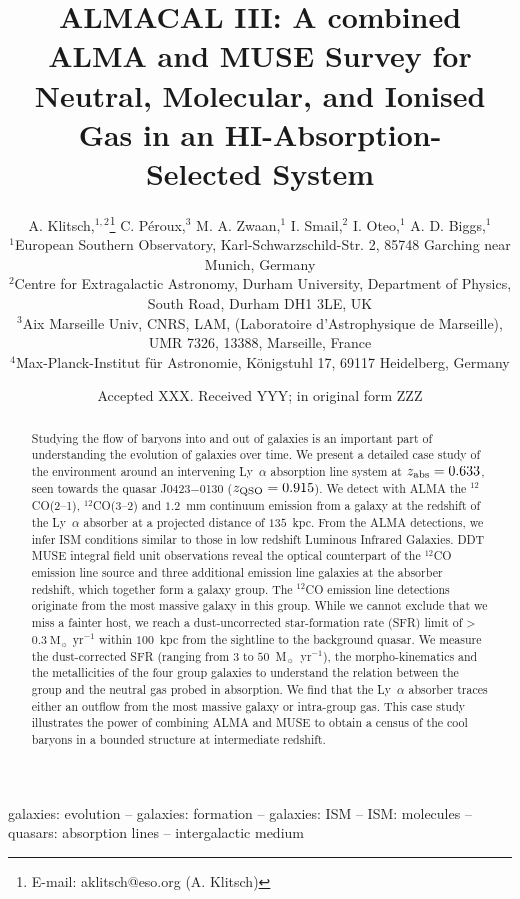 \documentclass[a4paper,fleqn,usenatbib]{mnras}
\title[ALMACAL III: Neutral, Molecular, and Ionised Gas around an Absorption-Selected System]{ALMACAL III: A combined ALMA and MUSE Survey for Neutral, Molecular, and Ionised Gas in an HI-Absorption-\\Selected System}
\author[A. Klitsch et al.]{A. Klitsch,$^{1,2}$\thanks{E-mail: aklitsch@eso.org (A. Klitsch)}
C. P\'eroux,$^{3}$ 
M. A. Zwaan,$^{1}$ 
I. Smail,$^{2}$ 
I. Oteo,$^{1}$ 
A. D. Biggs,$^{1}$ 
\newauthor{G. Popping$^{1,4}$ 
and A. M. Swinbank$^{2}$}\\
$^{1}$European Southern Observatory, Karl-Schwarzschild-Str. 2, 85748 Garching near Munich, Germany\\
$^{2}$Centre for Extragalactic Astronomy, Durham University, Department of Physics, South Road, Durham DH1 3LE, UK\\
$^{3}$Aix Marseille Univ, CNRS, LAM, (Laboratoire d'Astrophysique de Marseille), UMR 7326, 13388, Marseille, France\\
$^4$Max-Planck-Institut für Astronomie, Königstuhl 17, 69117 Heidelberg, Germany}
\date{Accepted XXX. Received YYY; in original form ZZZ}
\begin{document}
\label{firstpage}
\pagerange{\pageref{firstpage}--\pageref{lastpage}}
\maketitle

\begin{abstract}

Studying the flow of baryons into and out of galaxies is an important part of understanding the evolution of galaxies over time. We present a detailed case study of the environment around an intervening Ly~$\alpha$ absorption line system at $z_{\rm abs} = 0.633$, seen towards the quasar J0423$-$0130 ($z_{\rm QSO} = 0.915$). We detect with ALMA the \mbox{$^{12}$CO(2--1)}, \mbox{$^{12}$CO(3--2)}  and $1.2$~mm continuum emission from a galaxy at the redshift of the Ly~$\alpha$ absorber at a projected distance of $135$~kpc. From the ALMA detections, we infer ISM conditions similar to those in low redshift Luminous Infrared Galaxies.
DDT MUSE integral field unit observations reveal the optical counterpart of the $^{12}$CO emission line source and three additional emission line galaxies at the absorber redshift, which together form a galaxy group. The $^{12}$CO emission line detections originate from the most massive galaxy in this group. While we cannot exclude that we miss a fainter host, we reach a dust-uncorrected star-formation rate (SFR) limit of > $0.3~\text{M}_{\sun} \text{ yr}^{-1}$ within $100$~kpc from the sightline to the background quasar. We measure the dust-corrected SFR (ranging from $3$ to $50$~M$_{\sun}$~yr$^{-1}$), the morpho-kinematics and the metallicities of the four group galaxies to understand the relation between the group and the neutral gas probed in absorption. We find that the Ly~$\alpha$ absorber traces either an outflow from the most massive galaxy or intra-group gas. This case study illustrates the power of combining ALMA and MUSE to obtain a census of the cool baryons in a bounded structure at intermediate redshift.

\end{abstract}



\begin{keywords}
galaxies: evolution -- galaxies: formation -- galaxies: ISM -- ISM: molecules -- quasars: absorption lines -- intergalactic medium
\end{keywords}
\end{document}
